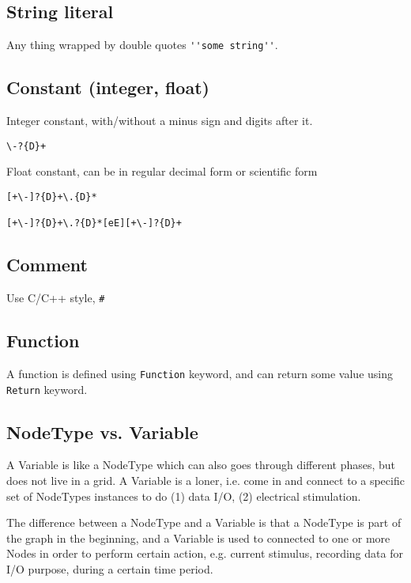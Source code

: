 \subsection{String literal}

Any thing wrapped by double quotes
\verb!''some string''!.

\subsection{Constant (integer, float)}

Integer constant, with/without a minus sign and digits after it.
\begin{verbatim}
\-?{D}+
\end{verbatim}

Float constant, can be in regular decimal form or scientific form
\begin{verbatim}
[+\-]?{D}+\.{D}* 

[+\-]?{D}+\.?{D}*[eE][+\-]?{D}+
\end{verbatim}

\subsection{Comment}

Use C/C++ style, \verb!#!

\subsection{Function}

A function is defined using \verb!Function! keyword, and can return some value
using \verb!Return! keyword.

\subsection{NodeType vs. Variable}
\label{sec:NodeType-GSL}
\label{sec:Variable-GSL}

A Variable is like a NodeType which can also goes through different phases, but
does not live in a grid. A Variable is a loner, i.e. come in and connect to a
specific set of NodeTypes instances to do (1) data I/O, (2) electrical
stimulation.


The difference between a NodeType and a Variable is that a NodeType is part of
the graph in the beginning, and a Variable is used to connected to one or more
Nodes in order to perform certain action, e.g. current stimulus, recording data
for I/O purpose, during a certain time period.


